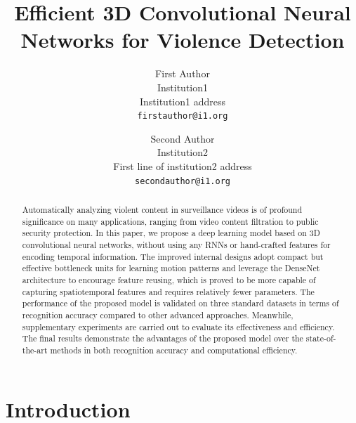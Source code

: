 \documentclass[10pt,twocolumn,letterpaper]{article}
\begin{document}
\title{Efficient 3D Convolutional Neural Networks for Violence Detection}

\author{First Author\\
Institution1\\
Institution1 address\\
{\tt\small firstauthor@i1.org}
\and
Second Author\\
Institution2\\
First line of institution2 address\\
{\tt\small secondauthor@i1.org}
}

\maketitle

\begin{abstract}
Automatically analyzing violent content in surveillance videos is of profound significance on many applications, ranging from video content filtration to public security protection. In this paper, we propose a deep learning model based on 3D convolutional neural networks, without using any RNNs or hand-crafted features for encoding temporal information. The improved internal designs adopt compact but effective bottleneck units for learning motion patterns and leverage the DenseNet architecture to encourage feature reusing, which is proved to be more capable of capturing spatiotemporal features and requires relatively fewer parameters. The performance of the proposed model is validated on three standard datasets in terms of recognition accuracy compared to other advanced approaches. Meanwhile, supplementary experiments are carried out to evaluate its effectiveness and efficiency. The final results demonstrate the advantages of the proposed model over the state-of-the-art methods in both recognition accuracy and computational efficiency.
\end{abstract}

\section{Introduction}
\label{sec:1}
\end{document}
